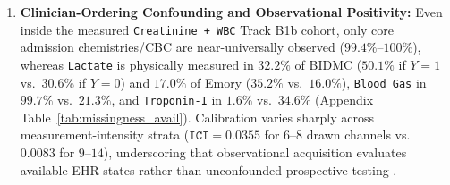\documentclass[11pt]{article}
\begin{document}
\begin{enumerate}
  \item \textbf{Clinician-Ordering Confounding and Observational Positivity:} Even inside the measured \texttt{Creatinine + WBC} Track B1b cohort, only core admission chemistries/CBC are near-universally observed ($99.4\%\text{--}100\%$), whereas \texttt{Lactate} is physically measured in $32.2\%$ of BIDMC ($50.1\%$ if $Y=1$ vs.\ $30.6\%$ if $Y=0$) and $17.0\%$ of Emory ($35.2\%$ vs.\ $16.0\%$), \texttt{Blood Gas} in $99.7\%$ vs.\ $21.3\%$, and \texttt{Troponin-I} in $1.6\%$ vs.\ $34.6\%$ (Appendix Table~\ref{tab:missingness_avail}). Calibration varies sharply across measurement-intensity strata ($\texttt{ICI}=0.0355$ for $6\text{--}8$ drawn channels vs.\ $0.0083$ for $9\text{--}14$), underscoring that observational acquisition evaluates available EHR states rather than unconfounded prospective testing \citep{vonkleist2025evaluation}.
\end{enumerate}
\end{document}
